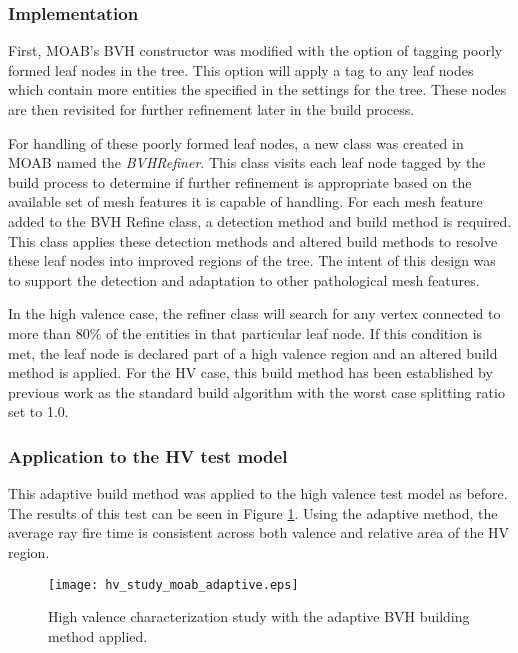 \subsubsection{Implementation}\label{subsec:adaptive_construction_implementation}

First, MOAB's BVH constructor was modified with the option of tagging poorly
formed leaf nodes in the tree. This option will apply a tag to any leaf nodes
which contain more entities the specified in the settings for the tree. These
nodes are then revisited for further refinement later in the build process.

For handling of these poorly formed leaf nodes, a new class was created in MOAB
named the \textit{BVHRefiner}. This class visits each leaf node tagged by the
build process to determine if further refinement is appropriate based on the
available set of mesh features it is capable of handling. For each mesh feature
added to the BVH Refine class, a detection method and build method is
required. This class applies these detection methods and altered build methods
to resolve these leaf nodes into improved regions of the tree. The intent of
this design was to support the detection and adaptation to other pathological mesh
features.

In the high valence case, the refiner class will search for any vertex connected
to more than 80\% of the entities in that particular leaf node. If this condition
is met, the leaf node is declared part of a high valence region and an altered
build method is applied. For the HV case, this build method has been established
by previous work as the standard build algorithm with the worst case splitting
ratio set to 1.0.

\subsubsection{Application to the HV test model}

This adaptive build method was applied to the high valence test model as
before. The results of this test can be seen in Figure
\ref{fig:hv_study_adaptive}. Using the adaptive method, the average ray fire
time is consistent across both valence and relative area of the HV region.

\begin{figure}
  \centering
  \texttt{[image: hv\_study\_moab\_adaptive.eps]}
  \caption{High valence characterization study with the adaptive BVH building method
    applied.}
  \label{fig:hv_study_adaptive}
\end{figure}

